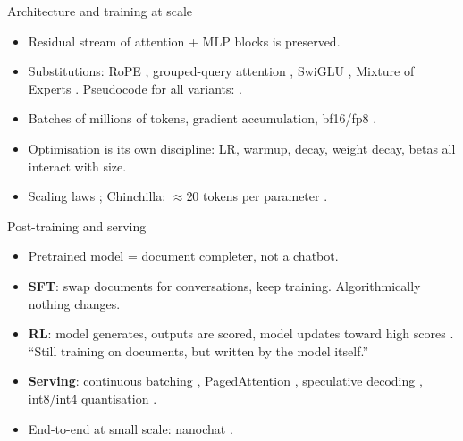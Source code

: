 \documentclass[aspectratio=169,11pt]{beamer}
\begin{document}
\begin{frame}{Architecture and training at scale}
\begin{itemize}
  \item Residual stream of attention + MLP blocks is preserved.
  \item Substitutions: RoPE \parencite{su2021rope}, grouped-query attention \parencite{ainslie2023gqa}, SwiGLU \parencite{shazeer2020glu}, Mixture of Experts \parencite{shazeer2017moe,fedus2022switch,deepseek2024v3}. Pseudocode for all variants: \textcite{phuong2022formal}.
  \item Batches of millions of tokens, gradient accumulation, bf16/fp8 \parencite{micikevicius2018mixed}.
  \item Optimisation is its own discipline: LR, warmup, decay, weight decay, betas all interact with size.
  \item Scaling laws \parencite{kaplan2020scaling}; Chinchilla: $\approx 20$ tokens per parameter \parencite{hoffmann2022chinchilla}.
\end{itemize}
\end{frame}

\begin{frame}{Post-training and serving}
\begin{itemize}
  \item Pretrained model = document completer, not a chatbot.
  \item \textbf{SFT}: swap documents for conversations, keep training. Algorithmically nothing changes.
  \item \textbf{RL}: model generates, outputs are scored, model updates toward high scores \parencite{christiano2017rlhf,ouyang2022instructgpt,schulman2017ppo,rafailov2023dpo,shao2024grpo}. ``Still training on documents, but written by the model itself.''
  \item \textbf{Serving}: continuous batching \parencite{yu2022orca}, PagedAttention \parencite{kwon2023vllm}, speculative decoding \parencite{leviathan2023speculative,chen2023speculative}, int8/int4 quantisation \parencite{dettmers2022int8,frantar2023gptq}.
  \item End-to-end at small scale: nanochat \parencite{karpathy2025nanochat}.
\end{itemize}
\end{frame}

\end{document}
